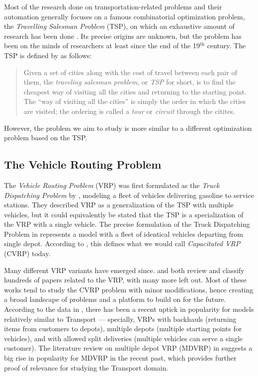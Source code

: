 Most of the research done on transportation-related problems and their automation
generally focuses
on a famous combinatorial optimization problem, the \textit{Travelling Salesman Problem} (TSP), on which an
exhaustive amount of research has been done \citep{Applegate1998, Applegate2011}.
Its precise origins are unknown, but the problem has been on the minds of researchers at least since the end of the 19$^\textrm{th}$ century. The TSP
is defined by \citet{Applegate2011} as follows:
\begin{quote}
Given a set of cities along with the cost of travel between each pair of them, the \textit{traveling salesman problem}, or \textit{TSP} for short, is to find the cheapest way of visiting all the cities and returning to the starting point. The ``way of visiting all the cities'' is simply the order in which the cities are visited; the ordering is called a \textit{tour} or \textit{circuit} through the citites.
\end{quote}
However, the problem we aim to study is more similar to a different optimization problem based on the TSP.


\subsection{The Vehicle Routing Problem}

The \textit{Vehicle Routing Problem} (VRP) was first formulated as the \textit{Truck Dispatching Problem} by \citet{Dantzig1959}, modeling a fleet of vehicles delivering gasoline to service stations. They described VRP
as a generalization of the TSP with multiple vehicles, but it could equivalently be stated that the TSP is a specialization of the VRP
with a single vehicle. The precise formulation of the Truck Dispatching Problem in \citep[Section~2]{Dantzig1959} represents a model with a fleet of identical vehicles departing from single depot. According to \citet[Section~3]{Braekers2016}, this defines what we would call \textit{Capacitated VRP} (CVRP) today.


Many different VRP variants have emerged since. \citet{Eksioglu2009} and \citet{Braekers2016} both
review and classify hundreds of papers related to the VRP, with many more left out.
Most of these works tend to study the CVRP problem with minor modifications, hence creating
a broad landscape of problems and a platform to build on for the future.
According to the data in \citet[Table~4]{Braekers2016}, there has been a recent uptick
in popularity for models relatively similar to Transport --- specially, VRPs with
backhauls (returning items from customers to depots),
multiple depots (multiple starting points for vehicles), and with allowed split deliveries (multiple
vehicles can serve a single customer).
The literature review on multiple depot VRP (MDVRP) in \citet{Montoya-Torres2015}
suggests a big rise in popularity for MDVRP in the recent past,
which provides further proof of relevance for studying the Transport domain.


